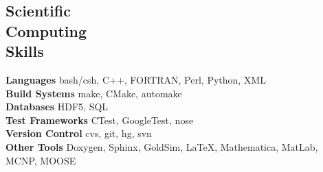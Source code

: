 \documentclass[margin,line]{resume}
\begin{document}
\begin{resume}
    \section{\mysidestyle Scientific\\Computing\\Skills}
                \textbf{Languages} \hfill bash/csh, C++, FORTRAN, Perl, Python, XML\vspace{.5mm}\\%
                \textbf{Build Systems} \hfill make, CMake, automake\vspace{.5mm}\\%
                \textbf{Databases} \hfill HDF5, SQL\vspace{.5mm}\\%
                \textbf{Test Frameworks} \hfill CTest, GoogleTest, nose\vspace{.5mm}\\%
                \textbf{Version Control} \hfill cvs, git, hg, svn\vspace{.5mm}\\%
                \textbf{Other Tools} \hfill Doxygen, Sphinx, GoldSim, \LaTeX, Mathematica, MatLab, MCNP, MOOSE\vspace{.5mm}%

\end{resume}
\end{document}
